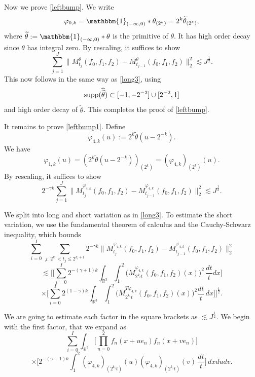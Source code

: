 \documentclass[12pt,reqno]{amsart}
\theoremstyle{plain}
\theoremstyle{definition}
\numberwithin{equation}{section}
\begin{document}
Now we prove \eqref{leftbump}.
We  write
\[\varphi_{0,k} = \mathbbm{1}_{(-\infty,0)}*\theta_{(2^k)} = 2^k  \widetilde{\theta}_{(2^k)} ,  \]
where   $\widetilde{\theta}:=\mathbbm{1}_{(-\infty,0)}*\theta$ is the primitive of $\theta$. It has high order decay since $\theta$ has integral zero. 
By rescaling, it suffices to show
    \[  \sum_{j=1}^{J} \|M^{\widetilde{\theta}}_{t_j}(f_0,f_1,f_2) - M^{\widetilde{\theta}}_{t_{j-1}}(f_0,f_1,f_2)\|_{2}^2  \lesssim  J^{\frac 12}.\]
This now follows in the same way as \eqref{long3}, using
\[\textup{supp}(\widehat{\widetilde{\theta}}) \subset [-1,-2^{-2}]\cup [2^{-2},1] \]
and high order  decay of $\widetilde{\theta}$.
This completes the proof of \eqref{leftbump}. 
 


It remains to prove \eqref{leftbump1}.
Define \[\varphi_{4,k}(u):= 2^{k} \widetilde{\theta}(u-2^{-k}).\]
We have
\[\varphi_{1,k}(u)=(2^k\widetilde{\theta}(u-2^{-k}))_{(2^k)} =  (\varphi_{4,k})_{(2^k)}(u) .\]
By rescaling, it suffices to show
    \[ 2^{-\gamma k} \sum_{j=1}^{J} \|M^{\varphi_{4,k}}_{t_j}(f_0,f_1,f_2) - M^{\varphi_{4,k}}_{t_{j-1}}(f_0,f_1,f_2)\|_{2}^2  \lesssim  J^{\frac 12}.  \]
 
We split into long and short variation as in \eqref{long3}.
To estimate the short variation, we use the fundamental theorem of calculus and the Cauchy-Schwarz inequality, which bounds
 \begin{equation*}%
 \sum_{i=0}^I\,\sum_{j:\, 2^{k_i}< t_j \leq 2^{k_{i}+1}} 2^{-\gamma k}\|M^{\varphi_{4,k}}_{t_{j}}(f_0,f_1,f_2) - M^{\varphi_{4,k}}_{t_{j-1}}(f_0,f_1,f_2)\|_{2}^2   \end{equation*}
\begin{equation}
 \label{shortvarlast}
 \lesssim   \Big[\Big[ \sum_{i=0}^I 2^{-(\gamma+1)k}\int_{\mathbb{R}^3} \int_{1}^2 \big( M_{2^{k_i}t}^{\varphi_{4,k}}(f_0,f_1,f_2)(x) \big)^2\, \frac{dt}{t} dx  \Big]
   \end{equation}
\[ \times \Big[ \sum_{i=0}^I 2^{(1-\gamma)k}\int_{\mathbb{R}^3} \int_{1}^2 \big( M_{2^{k_i}t}^{T\varphi_{4,k}}(f_0,f_1,f_2)(x) \big)^2 \frac{dt}{t} \,dx  \Big]\Big]^{\frac 12}.\]

We are going to estimate each factor in the square brackets as $\lesssim J^{\frac 12}$. 
We begin with the first factor, that we expand as
\begin{equation*} 
\sum_{i=0}^I  \int_{\mathbb{R}^5} \Big[\prod_{n=0}^2 f_n(x+ue_n) 
f_n(x+ve_n) \Big] 
\end{equation*}
\begin{equation*} 
\times\Big[2^{-(\gamma+1)k} \int_1^2  (\varphi_{4,k})_{(2^{k_i}t)} (u) (\varphi_{4,k})_{(2^{k_i}t)} (v)\, \frac{dt}{t} \Big] 
  \,dx du dv. 
\end{equation*}
\end{document}
